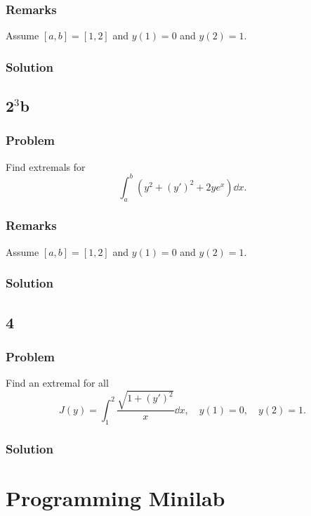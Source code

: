 \documentclass[12pt,twoside]{article}
\begin{document}
\subsubsection*{Remarks}
Assume $[a,b]=[1,2]$ and $y(1)=0$ and $y(2)=1$.

\subsubsection*{Solution}
\todo{}

\subsection{2$^3$b}
\subsubsection*{Problem}
Find extremals for
\begin{equation}
  \label{eq:4.3.2b-problem}
  \int_a^b(y^2+{(y')}^2 + 2ye^x)\dd{x}.
\end{equation}

\subsubsection*{Remarks}
Assume $[a,b]=[1,2]$ and $y(1)=0$ and $y(2)=1$.
\subsubsection*{Solution}
\todo{}

\subsection{4}
\subsubsection*{Problem}
Find an extremal for all
\begin{equation}
  \label{eq:4.3.4-problem}
  J(y) = \int_1^2\frac{\sqrt{1+{(y')}^2}}{x}\dd{x},\quad y(1)=0,\quad y(2)=1.
\end{equation}
\subsubsection*{Solution}
\todo{}

\section{Programming Minilab}
\end{document}
